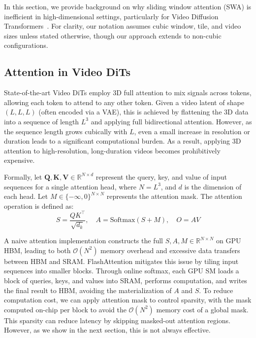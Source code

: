 In this section, we provide background on why sliding window attention (SWA) is inefficient in high-dimensional settings, particularly for Video Diffusion Transformers~\citep{peebles2023scalable}. For clarity, our notation assumes cubic window, tile, and video sizes unless stated otherwise, though our approach extends to non-cubic configurations.

\subsection{Attention in Video DiTs}
\label{sec:background_attention}
State-of-the-art Video DiTs employ 3D full attention to mix signals across tokens, allowing each token to attend to any other token. Given a video latent of shape $(L, L, L)$ (often encoded via a VAE), this is achieved by flattening the 3D data into a sequence of length $L^3$ and applying full bidirectional attention. However, as the sequence length grows cubically with $L$, even a small increase in resolution or duration leads to a significant computational burden. As a result, applying 3D attention to high-resolution, long-duration videos becomes prohibitively expensive.

Formally, let $\mathbf{Q}, \mathbf{K}, \mathbf{V} \in \mathbb{R}^{N \times d}$ represent the query, key, and value of input sequences for a single attention head, where $N=L^3$, and $d$ is the dimension of each head. Let \( M \in \{-\infty, 0\}^{N \times N} \) represents the attention mask. The attention operation is defined as:
\begin{equation}
    S = \frac{QK^\top}{\sqrt{d_k}}, \quad
    A = \text{Softmax}(S + M) , \quad
    O = AV 
    \label{eq:attention}
\end{equation}

A naive attention implementation constructs the full \( S, A, M \in \mathbb{R}^{N \times N} \) on GPU HBM, leading to both \(\mathcal{O}(N^2)\) memory overhead and excessive data transfers between HBM and SRAM. FlashAttention mitigates this issue by tiling input sequences into smaller blocks. Through online softmax, each GPU SM loads a block of queries, keys, and values into SRAM, performs computation, and writes the final result to HBM, avoiding the materialization of \( A \) and \( S \). To reduce computation cost, we can apply attention mask to control sparsity, with the mask computed on-chip per block to avoid the \(\mathcal{O}(N^2)\) memory cost of a global mask. This sparsity can reduce latency by skipping masked-out attention regions. However, as we show in the next section, this is not always effective.

